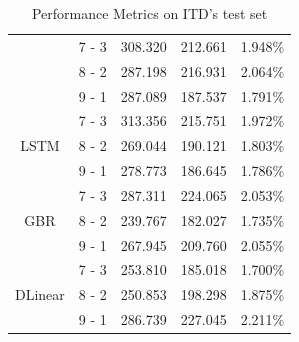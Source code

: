 \documentclass{ieeeojies}
\begin{document}
\begin{table}[H]
\begin{tabular}{|c|c|p{1cm}|p{1cm}|p{1cm}|}
                       & 7 - 3               & 308.320       & 212.661      & 1.948\%       \\
        \cline{2-5}
                       & 8 - 2               & 287.198       & 216.931      & 2.064\%       \\
        \cline{2-5}
                       & 9 - 1               & 287.089       & 187.537      & 1.791\%       \\
        \hline
        \multirow{3}{*}{LSTM}
                       & 7 - 3               & 313.356       & 215.751      & 1.972\%       \\
        \cline{2-5}
                       & 8 - 2               & 269.044       & 190.121      & 1.803\%       \\
        \cline{2-5}
                       & 9 - 1               & 278.773       & 186.645      & 1.786\%       \\
        \hline
        \multirow{3}{*}{GBR}
                       & 7 - 3               & 287.311       & 224.065      & 2.053\%       \\
        \cline{2-5}
                       & 8 - 2               & 239.767       & 182.027      & 1.735\%       \\
        \cline{2-5}
                       & 9 - 1               & 267.945       & 209.760      & 2.055\%       \\
        \hline
        \multirow{3}{*}{DLinear}
                       & 7 - 3               & 253.810       & 185.018      & 1.700\%       \\
        \cline{2-5}
                       & 8 - 2               & 250.853       & 198.298      & 1.875\%       \\
        \cline{2-5}
                       & 9 - 1               & 286.739       & 227.045      & 2.211\%       \\
        \hline
    \end{tabular}
    \caption{Performance Metrics on ITD's test set}
    \label{tab:performance_metrics_itd}
\end{table}
\end{document}
